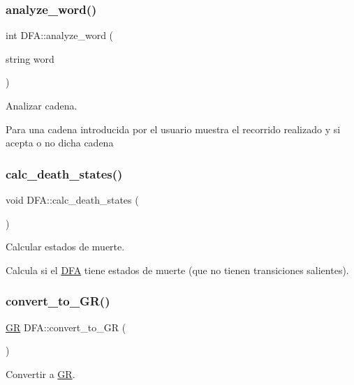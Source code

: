 \subsubsection{\texorpdfstring{analyze\+\_\+word()}{analyze\_word()}}
{\footnotesize\ttfamily int D\+F\+A\+::analyze\+\_\+word (\begin{DoxyParamCaption}\item[{string}]{word }\end{DoxyParamCaption})}



Analizar cadena. 

Para una cadena introducida por el usuario muestra el recorrido realizado y si acepta o no dicha cadena \mbox{\label{class_d_f_a_a33120a3dd98a3bf89f090b98340aa644}} 
\subsubsection{\texorpdfstring{calc\+\_\+death\+\_\+states()}{calc\_death\_states()}}
{\footnotesize\ttfamily void D\+F\+A\+::calc\+\_\+death\+\_\+states (\begin{DoxyParamCaption}{ }\end{DoxyParamCaption})}



Calcular estados de muerte. 

Calcula si el \mbox{\hyperlink{class_d_f_a}{D\+FA}} tiene estados de muerte (que no tienen transiciones salientes). \mbox{\label{class_d_f_a_a1e6d75070c094116a6d54f9ed61770e4}} 
\subsubsection{\texorpdfstring{convert\+\_\+to\+\_\+\+G\+R()}{convert\_to\_GR()}}
{\footnotesize\ttfamily \mbox{\hyperlink{class_g_r}{GR}} D\+F\+A\+::convert\+\_\+to\+\_\+\+GR (\begin{DoxyParamCaption}{ }\end{DoxyParamCaption})}



Convertir a \mbox{\hyperlink{class_g_r}{GR}}. 

